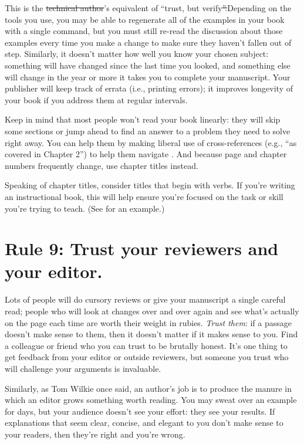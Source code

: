 \documentclass[10pt,letterpaper]{article}
\providecommand{\DIFadd}[1]{{\protect\color{blue}\uwave{#1}}} %
\providecommand{\DIFdel}[1]{{\protect\color{red}\sout{#1}}}                      %
\providecommand{\DIFaddbegin}{} %
\providecommand{\DIFaddend}{} %
\providecommand{\DIFdelbegin}{} %
\providecommand{\DIFdelend}{} %
\begin{document}
This is the \DIFdelbegin \DIFdel{technical author}\DIFdelend \DIFaddbegin \DIFadd{writer}\DIFaddend 's equivalent of ``trust, but verify\DIFdelbegin \DIFdel{''.}\DIFdelend \DIFaddbegin \DIFadd{.''  }\DIFaddend Depending
on the tools you use, you may be able to regenerate all of the
examples in your book with a single command, but you must still
re-read the discussion about those examples every time you make a
change to make sure they haven't fallen out of step. Similarly, it
doesn't matter how well you know your chosen subject: something will
have changed since the last time you looked, and something else will
change in the year or more it takes you to complete your
manuscript. Your publisher will keep track of errata (i.e., printing
errors); it improves longevity of your book if you address them at
regular intervals.

Keep in mind that most people won't read your book linearly: they will
skip some sections or jump ahead to find an answer to a problem they
need to solve right away. You can help them by making liberal use of
cross-references (e.g., ``as covered in Chapter 2'') to help them
navigate \cite{Li2020}. And because page and chapter numbers frequently
change, use chapter titles instead.

Speaking of chapter titles, consider titles that begin with verbs. If
you're writing an instructional book, this will help ensure you're
focused on the task or skill you're trying to teach. (See \cite{Me2022}
for an example.)

\section*{Rule 9: Trust your reviewers and your editor.}

Lots of people will do cursory reviews or give your manuscript a single
careful read; people who will look at changes over and over again and
see what's actually on the page each time are worth their weight in
rubies. \emph{Trust them}: if a passage doesn't make sense to them, then
it doesn't matter if it makes sense to you. Find a colleague or friend
who you can trust to be brutally honest. It's one thing to get feedback
from your editor or outside reviewers, but someone you trust who will
challenge your arguments is invaluable.

Similarly, as Tom Wilkie once said, an author's job is to produce the
manure in which an editor grows something worth reading. You may sweat
over an example for days, but your audience doesn't see your effort:
they see your results. If explanations that seem clear, concise, and
elegant to you don't make sense to your readers, then they're right and
you're wrong.
\end{document}
